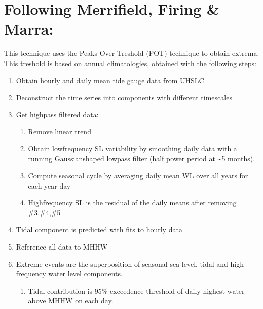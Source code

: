 \documentclass[letterpaper,10pt,english]{jupyterBook}
\begin{document}
\part{Following Merrifield, Firing \& Marra:}
\label{\detokenize{notebooks/regional_and_local/SL_Components_intra-annual:following-merrifield-firing-marra}}
\sphinxAtStartPar
This technique uses the Peaks Over Treshold (POT) technique to obtain extrema. This treshold is based on annual climatologies, obtained with the following steps:
\begin{enumerate}
%
\item {} 
\sphinxAtStartPar
Obtain hourly and daily mean tide gauge data from UHSLC

\item {} 
\sphinxAtStartPar
Deconstruct the time series into components with different timescales

\item {} 
\sphinxAtStartPar
Get high\sphinxhyphen{}pass filtered data:
\begin{enumerate}
%
\item {} 
\sphinxAtStartPar
Remove linear trend

\item {} 
\sphinxAtStartPar
Obtain low\sphinxhyphen{}frequency SL variability by smoothing daily data with a running Gaussian\sphinxhyphen{}shaped low\sphinxhyphen{}pass filter (half power period at \textasciitilde{}5 months).

\item {} 
\sphinxAtStartPar
Compute seasonal cycle by averaging daily mean WL over all years for each year day

\item {} 
\sphinxAtStartPar
High\sphinxhyphen{}frequency SL is the residual of the daily means after removing \#3,\#4,\#5

\end{enumerate}

\item {} 
\sphinxAtStartPar
Tidal component is predicted with fits to hourly data

\item {} 
\sphinxAtStartPar
Reference all data to MHHW

\item {} 
\sphinxAtStartPar
Extreme events are the superposition of seasonal sea level, tidal and high frequency water level components.
\begin{enumerate}
%
\item {} 
\sphinxAtStartPar
Tidal contribution is 95\% exceedence threshold of daily highest water above MHHW on each day.


\end{enumerate}
\end{enumerate}
\end{document}
